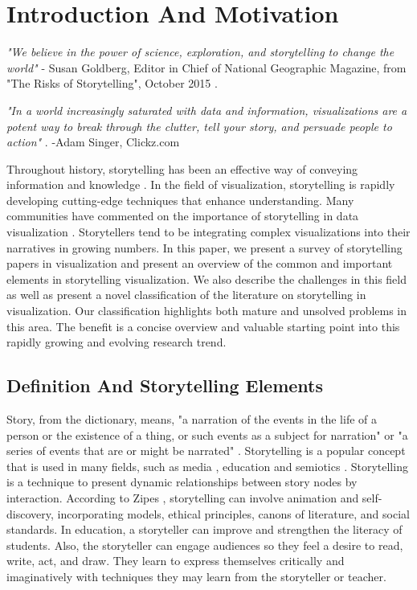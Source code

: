 \documentclass{egpubl}
\begin{document}
\section{Introduction And Motivation}
\textit{"We believe in the power of science, exploration, and storytelling to change the world"} - Susan Goldberg, Editor in Chief of National Geographic Magazine, from "The Risks of Storytelling", October 2015 \cite{risks2015}. 

\textit{"In a world increasingly saturated with data and information, visualizations are a potent way to break through the clutter, tell your story, and persuade people to action"} \cite{adam2015}. -Adam Singer, Clickz.com

Throughout history, storytelling has been an effective way of conveying information and knowledge \cite{Lidal2013}. In the field of visualization, storytelling is rapidly developing cutting-edge techniques that enhance understanding. Many communities have commented on the importance of storytelling in data visualization \cite{segal}. Storytellers tend to be integrating complex visualizations into their narratives in growing numbers. In this paper, we present a survey of storytelling papers in visualization and present an overview of the common and important elements in storytelling visualization. We also describe the challenges in this field as well as present a novel classification of the literature on storytelling in visualization. Our classification highlights both mature and unsolved problems in this area. The benefit is a concise overview and valuable starting point into this rapidly growing and evolving research trend. 

\subsection{Definition And Storytelling Elements}
Story, from the dictionary, means, "a narration of the events in the life of a person or the existence of a thing, or such events as a subject for narration" \cite{story1} or "a series of events that are or might be narrated" \cite{story2}. Storytelling is a popular concept that is used in many fields, such as media \cite{segal}, education \cite{Jack1995} and semiotics \cite{Martin1997}.
Storytelling is a technique to present dynamic relationships between story nodes by interaction.
According to Zipes \cite{Jack1995}, storytelling can involve animation and self-discovery, incorporating models, ethical principles, canons of literature, and social standards. In education, a storyteller can improve and strengthen the literacy of students. Also, the storyteller can engage audiences so they feel a desire to read, write, act, and draw. They learn to express themselves critically and imaginatively with techniques they may learn from the storyteller or teacher.
\end{document}
